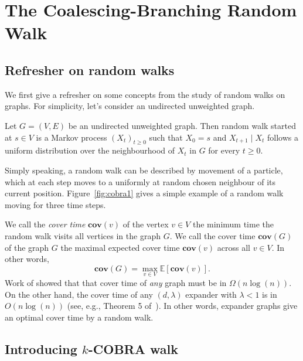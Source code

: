 \documentclass[11pt]{article}
\newcommand{\cov}{\mathbf{cov}}
\newcommand{\E}{\mathbb E}
\theoremstyle{remark}
\begin{document}
\newcommand{\coursenum}{{CSC 2421H}}
\newcommand{\coursename}{{Graphs, Matrices, and Optimization}}
\newcommand{\courseprof}{Sushant Sachdeva}


\section{The Coalescing-Branching Random Walk}

\subsection{Refresher on random walks}

We first give a refresher on some concepts from 
the study of random walks on graphs. For simplicity, let's consider an undirected unweighted graph.

\begin{definition}
\label{def:random-walk}
    Let $G = (V,E)$ be an undirected unweighted graph. Then random walk started at $s \in V$ is a Markov process $(X_t)_{t \ge 0}$ such that $X_0 = s$ and $X_{t+1} \mid X_t$ follows a uniform distribution over the neighbourhood of $X_t$ in $G$ for every $t \ge 0$.
\end{definition}

Simply speaking, a random walk can be described by movement of a particle, which at each step moves to a uniformly at random chosen neighbour of its current position. Figure~\ref{fig:cobra1} gives a simple example of a random walk moving for three time steps. 

We call the \emph{cover time} $\cov(v)$ of the vertex $v \in V$ the minimum time the random walk visits all vertices in the graph $G$. We call the cover time $\cov(G)$ of the graph $G$ the maximal expected cover time $\cov(v)$ across all $v \in V$. In other words,
\[
\cov(G) = \max_{v \in V} \E\left[\cov(v)\right].
\]
Work of \cite{Aldous1989LowerBF} showed that that cover time of \emph{any} graph must be in $\Omega(n\log(n))$. On the other hand, the cover time of any $(d,\lambda)$ expander with $\lambda < 1$ is in $O(n\log(n))$ (see, e.g., Theorem 5 of~\cite{Broder1988BoundsOT}). In other words, expander graphs give an optimal cover time by a random walk.

\subsection{Introducing $k$-COBRA walk}
\end{document}
